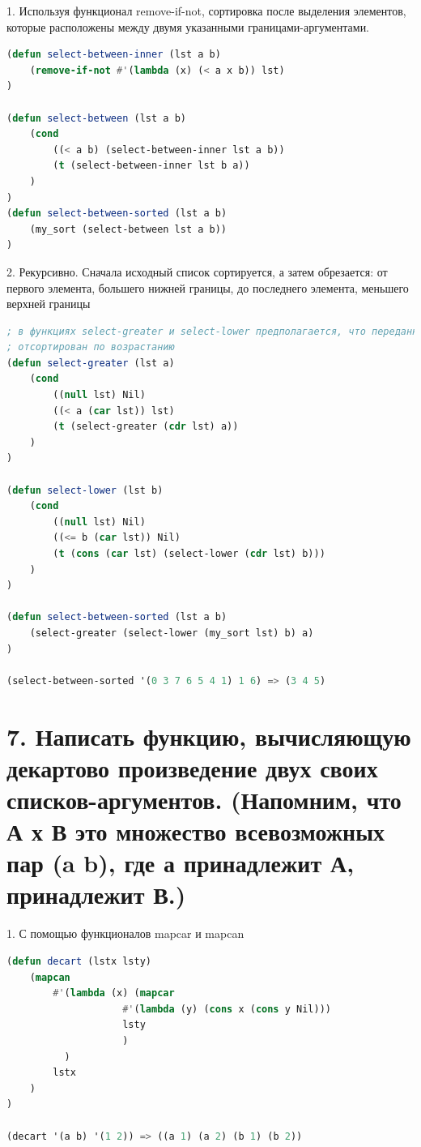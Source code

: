 \documentclass[12pt]{report}
\begin{document}
1. Используя функционал remove-if-not, сортировка после выделения элементов, которые расположены между двумя указанными границами-аргументами.
\begin{lstlisting}[language=Lisp]	
(defun select-between-inner (lst a b)
	(remove-if-not #'(lambda (x) (< a x b)) lst)
)

(defun select-between (lst a b)
	(cond 
		((< a b) (select-between-inner lst a b))
		(t (select-between-inner lst b a))
	)
)
(defun select-between-sorted (lst a b)
	(my_sort (select-between lst a b))
)
\end{lstlisting}

2. Рекурсивно. Сначала исходный список сортируется, а затем обрезается: от первого элемента, большего нижней границы, до последнего элемента, меньшего верхней границы	
\begin{lstlisting}[language=Lisp]
; в функциях select-greater и select-lower предполагается, что переданный список 
; отсортирован по возрастанию
(defun select-greater (lst a)
	(cond 
		((null lst) Nil)
		((< a (car lst)) lst)
		(t (select-greater (cdr lst) a))
	)
)

(defun select-lower (lst b)
	(cond 
		((null lst) Nil)
		((<= b (car lst)) Nil)
		(t (cons (car lst) (select-lower (cdr lst) b)))
	)
)

(defun select-between-sorted (lst a b)	
	(select-greater (select-lower (my_sort lst) b) a)	
)

(select-between-sorted '(0 3 7 6 5 4 1) 1 6) => (3 4 5)

\end{lstlisting}

\section*{7. Написать функцию, вычисляющую декартово произведение двух своих списков-аргументов. (Напомним, что А х В это множество всевозможных пар (a b), где а принадлежит А, принадлежит В.)}

1. С помощью функционалов mapcar и mapcan
\begin{lstlisting}[language=Lisp]
(defun decart (lstx lsty) 
	(mapcan 
		#'(lambda (x) (mapcar 
					#'(lambda (y) (cons x (cons y Nil))) 
					lsty
					)
		  )
		lstx
	)
)
	
(decart '(a b) '(1 2)) => ((a 1) (a 2) (b 1) (b 2))
	
\end{lstlisting}
\end{document}
